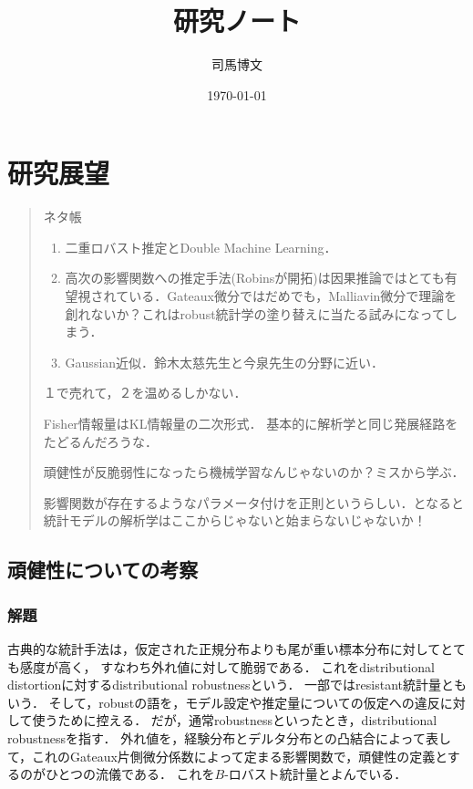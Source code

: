 \documentclass[uplatex,dvipdfmx]{jsreport}
\title{研究ノート}
\author{司馬博文}
\date{\today}
\begin{document}
\tableofcontents

\chapter{研究展望}

\begin{quotation}
    ネタ帳
    \begin{enumerate}
        \item 二重ロバスト推定とDouble Machine Learning．
        \item 高次の影響関数への推定手法(Robinsが開拓)は因果推論ではとても有望視されている．Gateaux微分ではだめでも，Malliavin微分で理論を創れないか？これはrobust統計学の塗り替えに当たる試みになってしまう．
        \item Gaussian近似．鈴木太慈先生と今泉先生の分野に近い．
    \end{enumerate}
    １で売れて，２を温めるしかない．

    Fisher情報量はKL情報量の二次形式．
    基本的に解析学と同じ発展経路をたどるんだろうな．

    頑健性が反脆弱性になったら機械学習なんじゃないのか？ミスから学ぶ．

    影響関数が存在するようなパラメータ付けを正則というらしい．となると統計モデルの解析学はここからじゃないと始まらないじゃないか！
\end{quotation}

\section{頑健性についての考察}

\subsection{解題}

\begin{usage}
    古典的な統計手法は，仮定された正規分布よりも尾が重い標本分布に対してとても感度が高く，
    すなわち外れ値に対して脆弱である．
    これをdistributional distortionに対するdistributional robustnessという．
    一部ではresistant統計量ともいう．
    そして，robustの語を，モデル設定や推定量についての仮定への違反に対して使うために控える．
    だが，通常robustnessといったとき，distributional robustnessを指す．
    外れ値を，経験分布とデルタ分布との凸結合によって表して，これのGateaux片側微分係数によって定まる影響関数で，頑健性の定義とするのがひとつの流儀である．
    これを$B$-ロバスト統計量とよんでいる．
\end{usage}
\end{document}
